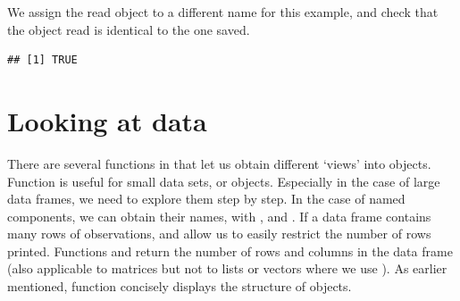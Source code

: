 \documentclass[krantz2]{krantz}\usepackage{knitr}%
\begin{document}
We assign the read object to a different name for this example, and check that the object read is identical to the one saved.
\begin{knitrout}\footnotesize
{}\color{fgcolor}\begin{kframe}
\begin{alltt}
 \hlkwb{<-} \hlstd{(}\hlstd{)}
\end{alltt}
\begin{verbatim}
## [1] TRUE
\end{verbatim}
\end{kframe}
\end{knitrout}

\begin{knitrout}\footnotesize
{}\color{fgcolor}\begin{kframe}
\begin{alltt}
\hlstd{(}\hlstd{)}
\end{alltt}
\end{kframe}
\end{knitrout}

\section{Looking at data}\label{sec:calc:looking:at:data}
There are several functions in \Rlang that let us obtain different `views' into objects. Function  is useful for small data sets, or objects. Especially in the case of large data frames, we need to explore them step by step. In the case of named components, we can obtain their names, with ,  and . If a data frame contains many rows of observations,  and  allow us to easily restrict the number of rows printed. Functions  and  return the number of rows and columns in the data frame (also applicable to matrices but not to lists or vectors where we use ). As earlier mentioned, function  concisely displays the structure of \Rlang objects.
\end{document}
